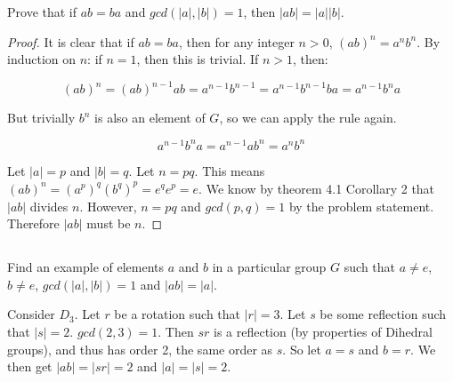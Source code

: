 \documentclass[a4paper,12pt]{article}
\begin{document}
Prove that if $ab = ba$ and $gcd(|a|, |b|) = 1$, then $|ab| = |a||b|$.

\begin{proof}
It is clear that if $ab = ba$, then for any integer $n > 0$, $(ab)^n = a^nb^n$. By induction on $n$: if $n = 1$, then this is trivial. If $n > 1$, then:

\begin{equation}
(ab)^n = (ab)^{n-1}ab = a^{n - 1}b^{n - 1} = a^{n - 1}b^{n-1}ba = a^{n - 1}b^na
\end{equation}

But trivially $b^n$ is also an element of $G$, so we can apply the rule again.

\begin{equation}
a^{n - 1}b^na = a^{n-1}ab^n = a^nb^n
\end{equation}

Let $|a| = p$ and $|b| = q$. Let $n = pq$. This means $(ab)^n = (a^p)^q(b^q)^p = e^qe^p = e$. We know by theorem 4.1 Corollary 2 that $|ab|$ divides $n$. However, $n = pq$ and $gcd(p, q) = 1$ by the problem statement. Therefore $|ab|$ must be $n$.
\end{proof}

\subsection{}

Find an example of elements $a$ and $b$ in a particular group $G$ such that $a \neq e$,
$b \neq e$, $gcd(|a|, |b|) = 1$ and $|ab| = |a|$.

Consider $D_3$. Let $r$ be a rotation such that $|r| = 3$. Let $s$ be some reflection such that $|s| = 2$. $gcd(2, 3) = 1$. Then $sr$ is a reflection (by properties of Dihedral groups), and thus has order 2, the same order as $s$. So let $a = s$ and $b = r$. We then get $|ab| = |sr| = 2$ and $|a| = |s| = 2$.
\end{document}
